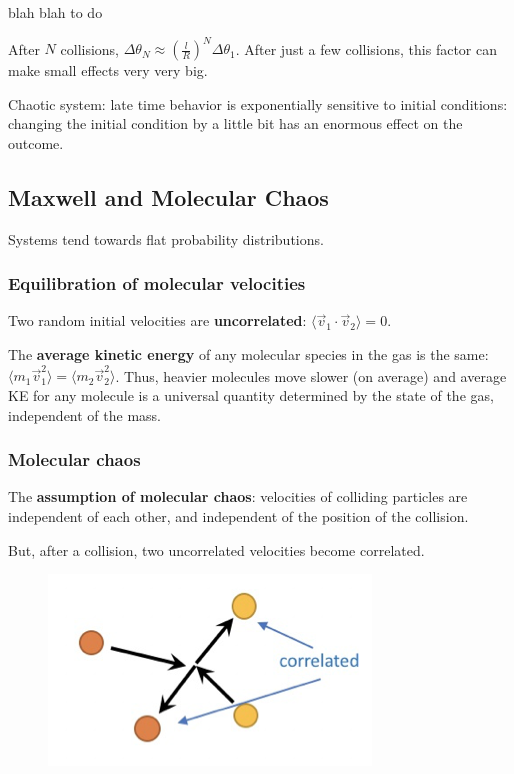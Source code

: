 blah blah to do

After $N$ collisions, $\Delta \theta_N \approx (\frac{l}{R})^N \Delta \theta_1$. After just a few collisions, this factor can make small effects very very big.

Chaotic system: late time behavior is exponentially sensitive to initial conditions: changing the initial condition by a little bit has an enormous effect on the outcome.

\subsection{Maxwell and Molecular Chaos}

Systems tend towards flat probability distributions.

\subsubsection{Equilibration of molecular velocities}

Two random initial velocities are \textbf{uncorrelated}: $\langle \vec{v}_1 \cdot \vec{v}_2 \rangle = 0$.

The \textbf{average kinetic energy} of any molecular species in the gas is the same: $\langle m_1 \vec{v}_1^2 \rangle = \langle m_2 \vec{v}_2^2 \rangle$. Thus, heavier molecules move slower (on average) and average KE for any molecule is a universal quantity determined by the state of the gas, independent of the mass.

\subsubsection{Molecular chaos}

The \textbf{assumption of molecular chaos}: velocities of colliding particles are independent of each other, and independent of the position of the collision.

But, after a collision, two uncorrelated velocities become correlated.

\begin{figure}[h]
    \centering
    \includegraphics[width=0.4\linewidth]{figures/03_03.png}
\end{figure}

